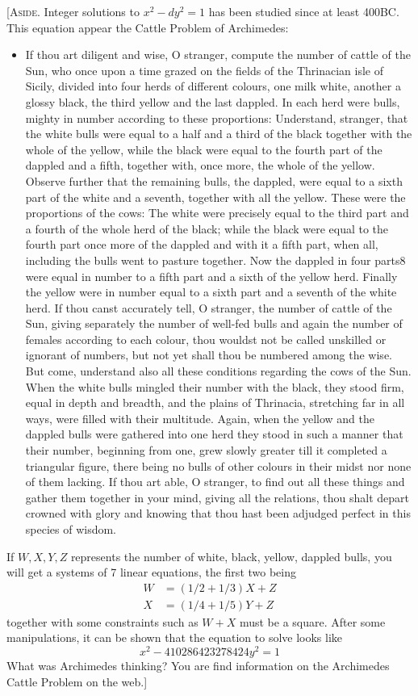   {\scriptsize
[\textsc{Aside.}
Integer solutions to $x^2 - dy^2 = 1$ has been studied since at least 400BC.
This equation appear the Cattle Problem of Archimedes:

\begin{itemize}
  \item[]
If thou art diligent and wise, O stranger, compute the number of
cattle of the Sun, who once upon a time grazed on the fields of the
Thrinacian isle of Sicily, divided into four herds of different colours,
one milk white, another a glossy black, the third yellow and the last
dappled. In each herd were bulls, mighty in number according to these
proportions: Understand, stranger, that the white bulls were equal to
a half and a third of the black together with the whole of the yellow,
while the black were equal to the fourth part of the dappled and
a fifth, together with, once more, the whole of the yellow. Observe
further that the remaining bulls, the dappled, were equal to a sixth
part of the white and a seventh, together with all the yellow. These
were the proportions of the cows: The white were precisely equal to the
third part and a fourth of the whole herd of the black; while the black
were equal to the fourth part once more of the dappled and with it a
fifth part, when all, including the bulls went to pasture together. Now
the dappled in four parts8 were equal in number to a fifth part and a
sixth of the yellow herd. Finally the yellow were in number equal to
a sixth part and a seventh of the white herd. If thou canst accurately
tell, O stranger, the number of cattle of the Sun, giving separately the
number of well-fed bulls and again the number of females according
to each colour, thou wouldst not be called unskilled or ignorant of
numbers, but not yet shall thou be numbered among the wise. But
come, understand also all these conditions regarding the cows of the
Sun. When the white bulls mingled their number with the black, they
stood firm, equal in depth and breadth, and the plains of Thrinacia,
stretching far in all ways, were filled with their multitude. Again,
when the yellow and the dappled bulls were gathered into one herd
they stood in such a manner that their number, beginning from one,
grew slowly greater till it completed a triangular figure, there being
no bulls of other colours in their midst nor none of them lacking.
If thou art able, O stranger, to find out all these things and gather
them together in your mind, giving all the relations, thou shalt depart
crowned with glory and knowing that thou hast been adjudged perfect
in this species of wisdom.
\end{itemize}

If $W,X,Y,Z$ represents the number of white, black, yellow,
dappled bulls, you will get 
a systems of 7 linear equations, the first two being 
\begin{align*}
  W &= (1/2 + 1/3)X + Z \\
  X &= (1/4 + 1/5)Y + Z
\end{align*}
together with some constraints such as $W + X$ must be a square.
After some manipulations, it can be shown that the equation to solve looks like
\[
  x^2 - 410286423278424 y^2 = 1
\]
What was Archimedes thinking? You are find information on the Archimedes Cattle Problem on the web.]
}

